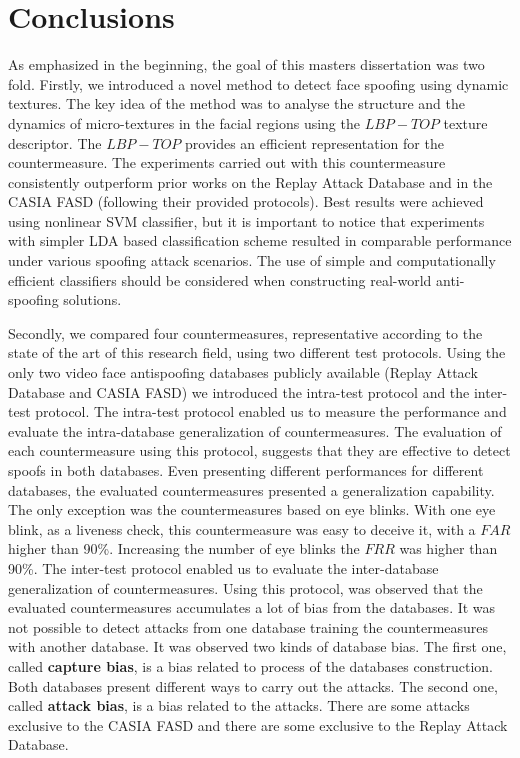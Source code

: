 \chapter{Conclusions}
\label{chap:Conclusions}

As emphasized in the beginning, the goal of this masters dissertation was two fold. Firstly, we introduced a novel method to detect face spoofing using dynamic textures. The key idea of the method was to analyse the structure and the dynamics of micro-textures in the facial regions using the $LBP-TOP$ texture descriptor. The $LBP-TOP$ provides an efficient representation for the countermeasure. The experiments carried out with this countermeasure consistently outperform prior works on the Replay Attack Database and in the CASIA FASD (following their provided protocols). Best results were achieved using nonlinear SVM classifier, but it is important to notice that experiments with simpler LDA based classification scheme resulted in comparable performance under various spoofing attack scenarios. The use of simple and computationally efficient classifiers should be considered when constructing real-world anti-spoofing solutions.

Secondly, we compared four countermeasures, representative according to the state of the art of this research field, using two different test protocols. Using the only two video face antispoofing databases publicly available (Replay Attack Database and CASIA FASD) we introduced the intra-test protocol and the inter-test protocol. The intra-test protocol enabled us to measure the performance and evaluate the intra-database generalization of countermeasures. The evaluation of each countermeasure using this protocol, suggests that they are effective to detect spoofs in both databases. Even presenting different performances for different databases, the evaluated countermeasures presented a generalization capability. The only exception was the countermeasures based on eye blinks. With one eye blink, as a liveness check, this countermeasure was easy to deceive it, with a $FAR$ higher than 90\%. Increasing the number of eye blinks the $FRR$ was higher than 90\%. The inter-test protocol enabled us to evaluate the inter-database generalization of countermeasures. Using this protocol, was observed that the evaluated countermeasures accumulates a lot of bias from the databases. It was not possible to detect attacks from one database training the countermeasures with another database. It was observed two kinds of database bias. The first one, called \textbf{capture bias}, is a bias related to process of the databases construction. Both databases present different ways to carry out the attacks. The second one, called \textbf{attack bias}, is a bias related to the attacks. There are some attacks exclusive to the CASIA FASD and there are some exclusive to the Replay Attack Database.


